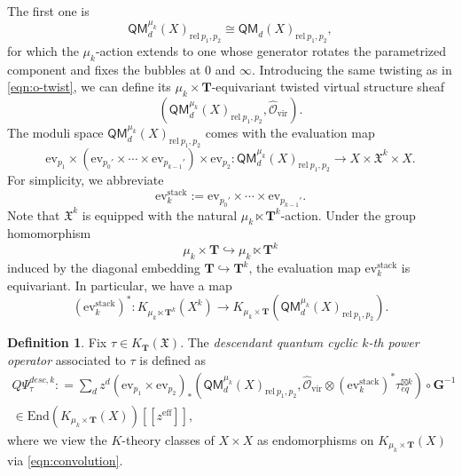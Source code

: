 \documentclass[reqno]{amsart}
\numberwithin{equation}{section}
\numberwithin{equation}{section}
\numberwithin{equation}{section}
\theoremstyle{definition}
\newtheorem{defn}[thm]{Definition}
\theoremstyle{remark}
\theoremstyle{remark}
\begin{document}
The first one is
\begin{equation}\label{eqn:cyclic-moduli}
    \mathsf{QM}_d^{\mu_k}(X)_{\mathrm{rel} \  p_1, p_2} \cong \mathsf{QM}_d(X)_{\mathrm{rel} \  p_1, p_2},
\end{equation}
for which the $\mu_k$-action extends to one whose generator rotates the parametrized component and fixes the bubbles at $0$ and $\infty$. Introducing the same twisting as in \eqref{eqn:o-twist}, we can define its $\mu_k \times \mathbf{T}$-equivariant twisted virtual structure sheaf 
\begin{equation}
    (\mathsf{QM}_d^{\mu_k}(X)_{\mathrm{rel} \  p_1, p_2}, \hat{\mathcal{O}}_{\mathrm{vir}}).
\end{equation}
The moduli space $\mathsf{QM}_d^{\mu_k}(X)_{\mathrm{rel} \  p_1, p_2}$ comes with the evaluation map
\begin{equation}
    \mathrm{ev}_{p_1} \times (\mathrm{ev}_{p_0'} \times \cdots \times \mathrm{ev}_{p_{k-1}'}) \times \mathrm{ev}_{p_2}: \mathsf{QM}_d^{\mu_k}(X)_{\mathrm{rel} \  p_1, p_2} \to X \times \mathfrak{X}^k \times X.
\end{equation}
For simplicity, we abbreviate
\begin{equation}
    \mathrm{ev}_k^{\mathrm{stack}} := \mathrm{ev}_{p_0'} \times \cdots \times \mathrm{ev}_{p_{k-1}'}.
\end{equation}
Note that $\mathfrak{X}^k$ is equipped with the natural $\mu_k \ltimes \mathbf{T}^k$-action. Under the group homomorphism
\begin{equation}
    \mu_k \times \mathbf{T} \hookrightarrow \mu_k \ltimes \mathbf{T}^k
\end{equation}
induced by the diagonal embedding $\mathbf{T} \hookrightarrow \mathbf{T}^{k}$, the evaluation map $\mathrm{ev}_k^{\mathrm{stack}}$ is equivariant. In particular, we have a map 
\begin{equation}\label{eqn:stack-ev}
    (\mathrm{ev}_k^{\mathrm{stack}})^*: K_{\mu_k \ltimes \mathbf{T}^k}(X^k) \to K_{\mu_k \times \mathbf{T}}(\mathsf{QM}_d^{\mu_k}(X)_{\mathrm{rel} \  p_1, p_2}).
\end{equation}

\begin{defn}
    Fix $ \tau \in K_{\mathbf{T}}(\mathfrak{X})$. The \emph{descendant quantum cyclic $k$-th power operator} associated to $\tau$ is defined as
    \begin{equation}\label{eqn:descendant-power}
        \begin{aligned}
        Q\Psi_\tau^{desc, k}: = \sum_{d} z^d (\mathrm{ev}_{p_1} \times \mathrm{ev}_{p_2})_* \left( \mathsf{QM}_d^{\mu_k}(X)_{\mathrm{rel} \  p_1, p_2}, \hat{\mathcal{O}}_{\mathrm{vir}} \otimes (\mathrm{ev}^{\mathrm{stack}}_k)^* \tau^{\boxtimes k}_{eq} \right) \circ \mathbf{G}^{-1} \\ \in \mathrm{End}(K_{\mu_k \times \mathbf{T}}(X))[\![ z^{\mathrm{eff}} ]\!],
        \end{aligned}
    \end{equation}
    where we view the $K$-theory classes of $X \times X$ as endomorphisms on $K_{\mu_k \times \mathbf{T}}(X)$ via \eqref{eqn:convolution}.
\end{defn}
\end{document}

